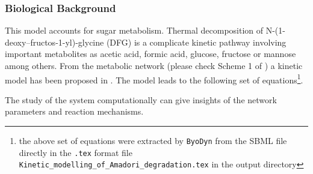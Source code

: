 \documentclass[a4paper, 11pt]{article}
\begin{document}
  \subsubsection{Biological Background}
  This model accounts for sugar metabolism.
  Thermal decomposition of N-(1-deoxy--fructos-1-yl)-glycine (DFG) is a complicate kinetic pathway involving important metabolites as acetic acid, formic acid, glucose, fructose or mannose among others.
  From the metabolic network (please check Scheme 1 of \cite{martins03}) a kinetic model has been proposed in \citep{martins03}.
  The model leads to the following set of equations\footnote{the above set of equations were extracted by \texttt{ByoDyn} from the SBML file directly in the \texttt{.tex} format file \texttt{Kinetic\_modelling\_of\_Amadori\_degradation.tex} in the output directory}.
  \begin{center}
    
  \end{center}
  The study of the system computationally can give insights of the network parameters and reaction mechanisms.
\end{document}
